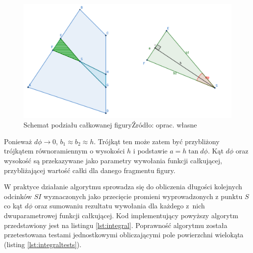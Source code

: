 \begin{figure}[ht]
	\centering
	\includegraphics[width=0.7\linewidth]{images/calkowanie-trojkaty}
	\caption[Schemat podziału całkowanej figury]{Schemat podziału całkowanej figury\newline Źródło: oprac. własne}
	\label{fig:calkowanie-trojkaty}
\end{figure}

Ponieważ $d\phi \rightarrow 0$, $b_1 \approx b_2 \approx h$. Trójkąt ten może zatem być przybliżony trójkątem równoramiennym o wysokości $h$ i podstawie $a=h \tan{d\phi}$. Kąt $d\phi$ oraz wysokość są przekazywane jako parametry wywołania funkcji całkującej, przybliżającej wartość całki dla danego fragmentu figury.

W praktyce działanie algorytmu sprowadza się do obliczenia długości kolejnych odcinków $SI$ wyznaczonych jako przecięcie promieni wyprowadzonych z punktu $S$ co kąt $d\phi$ oraz sumowaniu rezultatu wywołania dla każdego z~nich dwuparametrowej funkcji całkującej. Kod implementujący powyższy algorytm przedstawiony jest na listingu \ref{lst:integral}.	Poprawność algorytmu została przetestowana testami jednostkowymi obliczającymi pole powierzchni wielokąta (listing \ref{lst:integraltests}).





